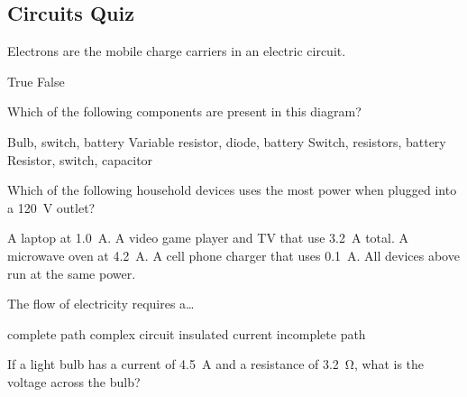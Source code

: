 \documentclass[]{exam}
\begin{document}
\clearpage

\subsection*{Circuits Quiz}

\begin{questions}
\question
Electrons are the mobile charge carriers in an electric circuit.

\begin{randomizechoices}[norandomize]
    \correctchoice True
    \choice False
\end{randomizechoices}

\question
Which of the following components are present in this diagram?

\begin{center}
\end{center}

\begin{randomizechoices}
    \choice Bulb, switch, battery
    \choice Variable resistor, diode, battery
    \correctchoice Switch, resistors, battery
    \choice Resistor, switch, capacitor
\end{randomizechoices}

\question
Which of the following household devices uses the most power when plugged into a \SI{120}{V} outlet?

\begin{randomizechoices}[keeplast]
    \choice A laptop at \SI{1.0}{A}.
    \choice A video game player and TV that use \SI{3.2}{A} total.
    \correctchoice A microwave oven at \SI{4.2}{A}.
    \choice A cell phone charger that uses \SI{0.1}{A}.
    \choice All devices above run at the same power.
\end{randomizechoices}

\question
The flow of electricity requires a\ldots 

\begin{randomizechoices}
    \correctchoice complete path
    \choice complex circuit
    \choice insulated current
    \choice incomplete path
\end{randomizechoices}

\question
If a light bulb has a current of \SI{4.5}{A} and a resistance of \SI{3.2}{\ohm}, what is the voltage across the bulb?


\end{questions}
\end{document}
